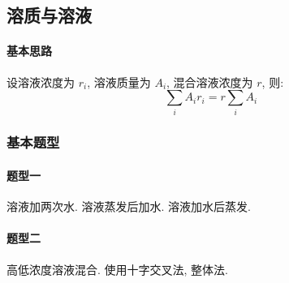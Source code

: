 \subsection{溶质与溶液}

\paragraph{基本思路} 设溶液浓度为 $r_i$, 溶液质量为 $A_i$, 混合溶液浓度为 $r$, 则:
\[
	\sum_{i}A_i r_i = r\sum_{i}A_i
\]

\subsubsection{基本题型}

\paragraph{题型一} 溶液加两次水. 溶液蒸发后加水. 溶液加水后蒸发.

\paragraph{题型二} 高低浓度溶液混合. 使用十字交叉法, 整体法.